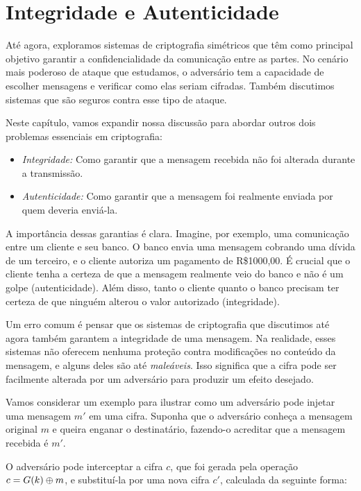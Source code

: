 \chapter{Integridade e Autenticidade}
\label{cha:mac}

Até agora, exploramos sistemas de criptografia simétricos que têm como principal objetivo garantir a confidencialidade da comunicação entre as partes.
No cenário mais poderoso de ataque que estudamos, o adversário tem a capacidade de escolher mensagens e verificar como elas seriam cifradas.
Também discutimos sistemas que são seguros contra esse tipo de ataque.

Neste capítulo, vamos expandir nossa discussão para abordar outros dois problemas essenciais em criptografia:

\begin{itemize}
\item {\em Integridade:} Como garantir que a mensagem recebida não foi alterada durante a transmissão.
\item {\em Autenticidade:} Como garantir que a mensagem foi realmente enviada por quem deveria enviá-la.
\end{itemize}

A importância dessas garantias é clara.
Imagine, por exemplo, uma comunicação entre um cliente e seu banco.
O banco envia uma mensagem cobrando uma dívida de um terceiro, e o cliente autoriza um pagamento de R\$1000,00.
É crucial que o cliente tenha a certeza de que a mensagem realmente veio do banco e não é um golpe (autenticidade).
Além disso, tanto o cliente quanto o banco precisam ter certeza de que ninguém alterou o valor autorizado (integridade).

Um erro comum é pensar que os sistemas de criptografia que discutimos até agora também garantem a integridade de uma mensagem.
Na realidade, esses sistemas não oferecem nenhuma proteção contra modificações no conteúdo da mensagem, e alguns deles são até {\em maleáveis}.
Isso significa que a cifra pode ser facilmente alterada por um adversário para produzir um efeito desejado.

Vamos considerar um exemplo para ilustrar como um adversário pode injetar uma mensagem $m'$ em uma cifra.
Suponha que o adversário conheça a mensagem original $m$ e queira enganar o destinatário, fazendo-o acreditar que a mensagem recebida é $m'$.

O adversário pode interceptar a cifra $c$, que foi gerada pela operação $c = G(k) \oplus m$, e substituí-la por uma nova cifra $c'$, calculada da seguinte forma:

